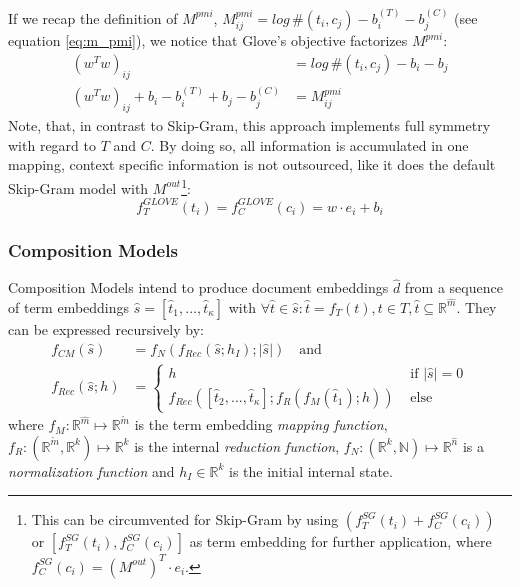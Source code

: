If we recap the definition of $M^{pmi}$, $M^{pmi}_{ij}= log\,\#(t_i, c_j) - b^{(T)}_i - b^{(C)}_j$ (see equation \eqref{eq:m_pmi}), we notice that Glove's objective factorizes $M^{pmi}$:%
\begin{align}
(w^Tw)_{ij} & = log\,\#(t_i, c_j) - b_i - b_j \\
(w^Tw)_{ij} + b_i - b^{(T)}_i + b_j - b^{(C)}_j & = M^{pmi}_{ij}
\end{align}
Note, that, in contrast to Skip-Gram, this approach implements full symmetry with regard to $T$ and $C$. By doing so, all information is accumulated in one mapping, context specific information is not outsourced, like it does the default Skip-Gram model with $M^{out}$\footnote{This can be circumvented for Skip-Gram by using $(f^{SG}_T(t_i) + f^{SG}_C(c_i))$ or $[f^{SG}_T(t_i), f^{SG}_C(c_i)]$ as term embedding for further application, where $f_C^{SG}(c_i) = (M^{out})^T \cdot e_i$.}:
\begin{equation}
f_T^{GLOVE}(t_i) = f_C^{GLOVE}(c_i) = w \cdot e_i + b_i 
\end{equation}

\subsubsection{Composition Models}
Composition Models intend to produce document embeddings $\hat{d}$ from a sequence of term embeddings $\hat{s} = [\hat{t}_1, ..., \hat{t}_\kappa]$ with $\forall \hat{t} \in \hat{s}: \hat{t} = f_T(t), t \in T, \hat{t} \subseteq \mathbb{R}^{\hat{m}}$. They can be expressed recursively by:
\begin{equation}
\begin{split}
f_{CM}(\hat{s}) & = f_N(f_{Rec}(\hat{s}; h_I); |\hat{s}|) \quad \text{and} \\
f_{Rec}(\hat{s}; h) & = 
  \begin{cases}  
    h & \text{ if }|\hat{s}|=0 \\
    f_{Rec}([\hat{t}_2, ..., \hat{t}_\kappa]; f_R(f_M(\hat{t}_1); h)) & \text{ else}
  \end{cases}
\end{split}
\end{equation}
where $f_M: \mathbb{R}^{\hat{m}} \mapsto \mathbb{R}^{\mathring{m}}$ is the term embedding \textit{mapping function}, $f_R: (\mathbb{R}^{\mathring{m}},\mathbb{R}^k) \mapsto \mathbb{R}^k$ is the internal \textit{reduction function}, $f_N: (\mathbb{R}^k, \mathbb{N}) \mapsto \mathbb{R}^{\hat{n}}$ is a \textit{normalization function} and $h_I \in \mathbb{R}^k$ is the initial internal state.

